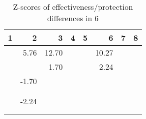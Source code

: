 \begin{table}[ht]
\centering
\begin{tabular}{rrrrrrrr}
  \hline
1 & 2 & 3 & 4 & 5 & 6 & 7 & 8 \\ 
  \hline
 & 5.76 & 12.70 &  &  & 10.27 &  &  \\ 
   &  & 1.70 &  &  & 2.24 &  &  \\ 
   & -1.70 &  &  &  &  &  &  \\ 
   &  &  &  &  &  &  &  \\ 
   &  &  &  &  &  &  &  \\ 
   & -2.24 &  &  &  &  &  &  \\ 
   &  &  &  &  &  &  &  \\ 
   &  &  &  &  &  &  &  \\ 
   \hline
\end{tabular}
\caption{Z-scores of effectiveness/protection differences in  6} 
\end{table}
